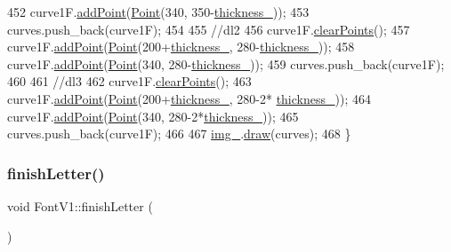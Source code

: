 \begin{DoxyCode}
452     curve1F.\mbox{\hyperlink{class_bezier_curve_a38d16c18b36ae45619b05e26e226cf34}{addPoint}}(\mbox{\hyperlink{class_point}{Point}}(340, 350-\mbox{\hyperlink{class_font_v1_aed8040e76be9a52833627b92f0fb4e5f}{thickness\_}}));
453     curves.push\_back(curve1F);
454 
455     \textcolor{comment}{//dl2}
456     curve1F.\mbox{\hyperlink{class_bezier_curve_a0ba8ce66d5af5971ae6a1b506029728e}{clearPoints}}();
457     curve1F.\mbox{\hyperlink{class_bezier_curve_a38d16c18b36ae45619b05e26e226cf34}{addPoint}}(\mbox{\hyperlink{class_point}{Point}}(200+\mbox{\hyperlink{class_font_v1_aed8040e76be9a52833627b92f0fb4e5f}{thickness\_}}, 280-\mbox{\hyperlink{class_font_v1_aed8040e76be9a52833627b92f0fb4e5f}{thickness\_}}));
458     curve1F.\mbox{\hyperlink{class_bezier_curve_a38d16c18b36ae45619b05e26e226cf34}{addPoint}}(\mbox{\hyperlink{class_point}{Point}}(340, 280-\mbox{\hyperlink{class_font_v1_aed8040e76be9a52833627b92f0fb4e5f}{thickness\_}}));
459     curves.push\_back(curve1F);
460 
461     \textcolor{comment}{//dl3}
462     curve1F.\mbox{\hyperlink{class_bezier_curve_a0ba8ce66d5af5971ae6a1b506029728e}{clearPoints}}();
463     curve1F.\mbox{\hyperlink{class_bezier_curve_a38d16c18b36ae45619b05e26e226cf34}{addPoint}}(\mbox{\hyperlink{class_point}{Point}}(200+\mbox{\hyperlink{class_font_v1_aed8040e76be9a52833627b92f0fb4e5f}{thickness\_}}, 280-2*
      \mbox{\hyperlink{class_font_v1_aed8040e76be9a52833627b92f0fb4e5f}{thickness\_}}));
464     curve1F.\mbox{\hyperlink{class_bezier_curve_a38d16c18b36ae45619b05e26e226cf34}{addPoint}}(\mbox{\hyperlink{class_point}{Point}}(340, 280-2*\mbox{\hyperlink{class_font_v1_aed8040e76be9a52833627b92f0fb4e5f}{thickness\_}}));
465     curves.push\_back(curve1F);
466 
467     \mbox{\hyperlink{class_font_v1_a00569e3e3c4b70f437b63f396f735fb0}{img\_}}.\mbox{\hyperlink{class_image_a8d162f3cab956131d58708c09aa560b0}{draw}}(curves);
468 \}
\end{DoxyCode}
\mbox{\label{class_font_v1_a29e1b96b06056aad8542c3d2ac79ebf2}} 
\subsubsection{\texorpdfstring{finish\+Letter()}{finishLetter()}}
{\footnotesize\ttfamily void Font\+V1\+::finish\+Letter (\begin{DoxyParamCaption}{ }\end{DoxyParamCaption})}


